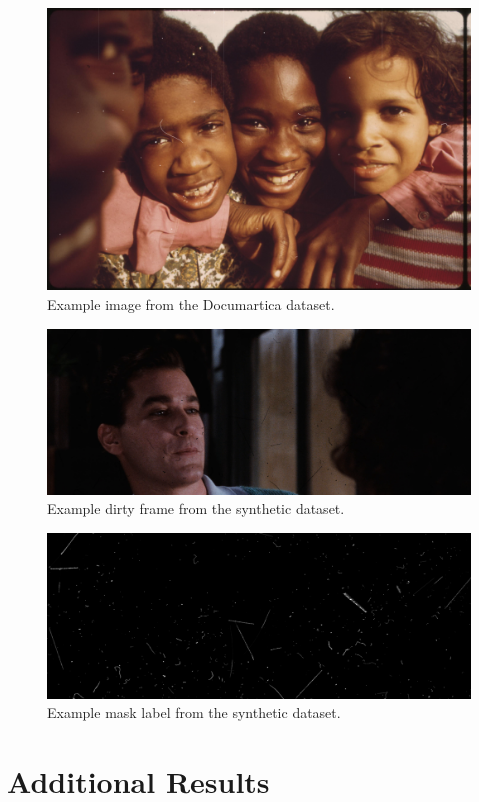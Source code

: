\documentclass[10pt,a4paper,twocolumn,twoside]{article}
\begin{document}
\begin{figure}[h]
    \centering
    \includegraphics[width=0.6\linewidth]{img/docu.jpg}
    \caption{Example image from the Documartica dataset.}
    \label{fig:anex1}
\end{figure}
\begin{figure}[h]
    \centering
    \includegraphics[width=0.7\linewidth]{img/goodfellas_frame_0113.png}
    \caption{Example dirty frame from the synthetic dataset.}
    \label{fig:anex2}
\end{figure}
\begin{figure}[h]
    \centering
    \includegraphics[width=0.7\linewidth]{img/inverse_mask.png}
    \caption{Example mask label from the synthetic dataset.}
    \label{fig:anex3}
\end{figure}
\newpage
\section{Additional Results}
\end{document}
